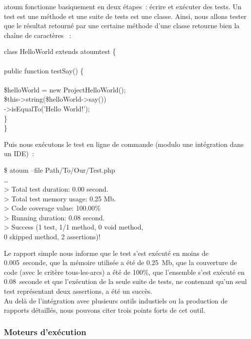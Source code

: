 atoum fonctionne basiquement en deux étapes~: écrire et exécuter des tests. Un
test est une méthode et une suite de tests est une classe. Ainsi, nous allons
tester que le résultat retourné par une certaine méthode  d'une classe
 retourne bien la chaîne de caractères
~:
%
\begin{pre}
class HelloWorld extends \bslash{}atoum\bslash{}test \{ \\
 \\
    public function testSay() \{ \\
 \\
        \$helloWorld = new \bslash{}Project\bslash{}HelloWorld(); \\
        \$this->string(\$helloWorld->say()) \\
                  ->isEqualTo('Hello World!'); \\
    \} \\
\}
\end{pre}
%
Puis nous exécutons le test en ligne de commande (modulo une intégration dans un
IDE)~:
%
\begin{pre}
\$ atoum --file Path/To/Our/Test.php \\
… \\
> Total test duration: 0.00 second. \\
> Total test memory usage: 0.25 Mb. \\
> Code coverage value: 100.00\% \\
> Running duration: 0.08 second. \\
> Success (1 test, 1/1 method, 0 void method, \\
           0 skipped method, 2 assertions)!
\end{pre}
%
Le rapport simple nous informe que le test s'est exécuté en moins de
0.005~seconde, que la mémoire utilisée a été de 0.25~Mb, que la couverture de
code (avec le critère tous-les-arcs) a été de 100\%, que l'ensemble s'est
exécuté en 0.08~seconde et que l'exécution de la seule suite de tests, ne
contenant qu'un seul test représentant deux assertions, a été un succès. \\

Au delà de l'intégration avec plusieurs outils industiels ou la production de
rapports détaillés, nous pouvons citer trois points forts de cet outil.

\subsubsection{Moteurs d'exécution}

